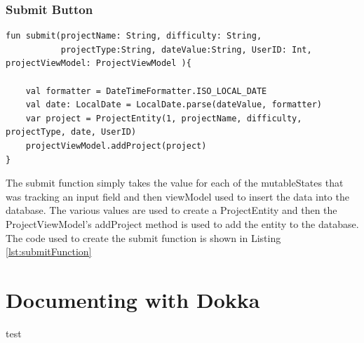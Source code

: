 \documentclass[12pt]{article}
\begin{document}
\subsubsection{Submit Button}
\begin{lstlisting}[numbers=none, 
			caption=Submit Function ,
			label={lst:submitFunction}]
 fun submit(projectName: String, difficulty: String,
           projectType:String, dateValue:String, UserID: Int, projectViewModel: ProjectViewModel ){

    val formatter = DateTimeFormatter.ISO_LOCAL_DATE
    val date: LocalDate = LocalDate.parse(dateValue, formatter)
    var project = ProjectEntity(1, projectName, difficulty, projectType, date, UserID)
    projectViewModel.addProject(project)
}
\end{lstlisting}
The submit function simply takes the value for each of the mutableStates that was tracking an input field and then viewModel used to insert the data into the database. The various values are used to create a ProjectEntity and then the ProjectViewModel's addProject method is used to add the entity to the database. The code used to create the submit function is shown in Listing \ref{lst:submitFunction}

\section{Documenting with Dokka}
test
\begin{appendix}
  \listoffigures
  \newpage
  \listoftables
  \newpage
  \lstlistoflistings

\end{appendix}
\newpage
\RaggedRight
{}
  
\end{document}
